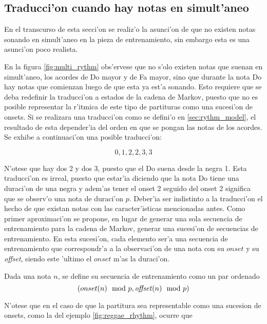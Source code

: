 \subsection{Traducci'on cuando hay notas en simult'aneo}
En el transcurso de esta secci'on se realiz'o la asunci'on de que no existen notas sonando en simult'aneo en la pieza de entrenamiento, sin embargo esta es una asunci'on poco
realista.


\begin{imagen}
\end{imagen}

En la figura \ref{fig:multi_rythm} obs'ervese que no s'olo existen notas que suenan en simult'aneo, los acordes de Do mayor y de Fa mayor, 
sino que durante la nota Do hay notas que comienzan luego de que esta ya est'a sonando. Esto requiere que se deba redefinir la traducci'on
a estados de la cadena de Markov, puesto que no es posible representar la r'itmica de este tipo de partituras como una sucesi'on de onsets. 
Si se realizara una traducci'on como se defini'o en \ref{sec:rythm_model}, el resultado de esta depender'ia del orden en que se pongan
las notas de los acordes. Se exhibe a continuaci'on una posible traducci'on:

$$0, 1, 2, 2, 3, 3$$

N'otese que hay dos 2 y dos 3, puesto que el Do suena desde la negra 1. Esta traducci'on es irreal, puesto que estar'ia diciendo que la nota Do tiene
una duraci'on de una negra y adem'as tener el onset 2 seguido del onset 2 significa que se observ'o una nota de duraci'on $p$. 
Deber'ia ser indistinto a la traducci'on el hecho de que existan notas 
con las caracter'isticas mencionadas antes. Como primer aproximaci'on se propone, en lugar de generar una sola secuencia de entrenamiento para la cadena
de Markov, generar una sucesi'on de secuencias de entrenamiento. En esta sucesi'on, cada elemento ser'a una secuencia de entrenamiento
que correspondr'a a la observaci'on de una nota con su $onset$ y su \emph{offset}, siendo este 'ultimo el $onset$ m'as la duraci'on. 

\begin{definition}
\label{def:traduccion1}
Dada una nota $n$, se define su secuencia de entrenamiento como un par ordenado $$(onset(n) \mod p, \text{\emph{offset}}(n)\mod p)$$
\end{definition}

N'otese que en el caso de que la partitura sea representable como una sucesion de onsets, como la del ejemplo \ref{fig:reggae_rhythm}, ocurre que 

